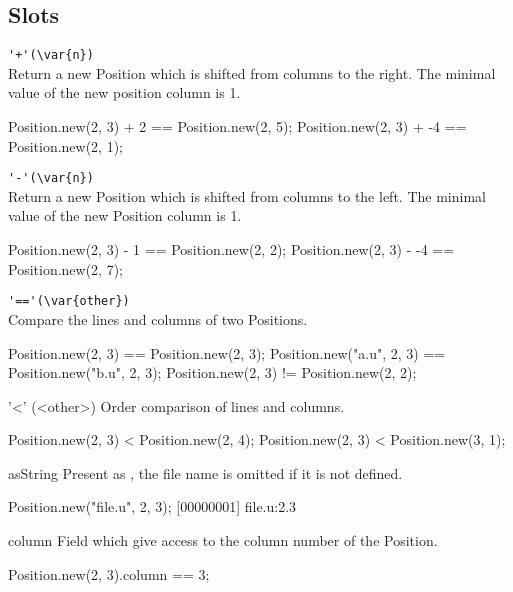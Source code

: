 \subsection{Slots}

\begin{urbiscriptapi}
\item \lstinline|'+'(\var{n})|\\
  Return a new Position which is shifted from  columns to the
  right.  The minimal value of the new position column is 1.
\begin{urbiassert}
Position.new(2, 3) + 2 == Position.new(2, 5);
Position.new(2, 3) + -4 == Position.new(2, 1);
\end{urbiassert}

\item \lstinline|'-'(\var{n})|\\
  Return a new Position which is shifted from  columns to the
  left.  The minimal value of the new Position column is 1.
\begin{urbiassert}
Position.new(2, 3) - 1 == Position.new(2, 2);
Position.new(2, 3) - -4 == Position.new(2, 7);
\end{urbiassert}

\item \lstinline|'=='(\var{other})|\\
  Compare the lines and columns of two Positions.
\begin{urbiassert}
Position.new(2, 3) == Position.new(2, 3);
Position.new("a.u", 2, 3) == Position.new("b.u", 2, 3);
Position.new(2, 3) != Position.new(2, 2);
\end{urbiassert}

\item['<'](<other>)%
  Order comparison of lines and columns.
\begin{urbiassert}
Position.new(2, 3) < Position.new(2, 4);
Position.new(2, 3) < Position.new(3, 1);
\end{urbiassert}

\item[asString]
  Present as , the file name is
  omitted if it is not defined.
\begin{urbiscript}
Position.new("file.u", 2, 3);
[00000001] file.u:2.3
\end{urbiscript}

\item[column]
  Field which give access to the column number of the Position.
\begin{urbiassert}
Position.new(2, 3).column == 3;
\end{urbiassert}


\end{urbiscriptapi}
